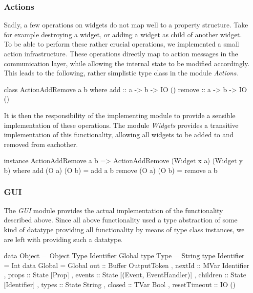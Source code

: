 \documentclass[11pt,a4paper]{article}
\begin{document}
\subsubsection{Actions}
Sadly, a few operations on widgets do not map well to a property structure.
Take for example destroying a widget, or adding a widget as child of another widget.
To be able to perform these rather crucial operations, we implemented a small action infrastructure.
These operations directly map to action messages in the communication layer, while allowing the internal state to be modified accordingly.
This leads to the following, rather simplistic type class in the module \textit{Actions}.

\begin{haskell}
class ActionAddRemove a b where
    add :: a -> b -> IO ()
    remove :: a -> b -> IO ()
\end{haskell}

It is then the responsibility of the implementing module to provide a sensible implementation of these operations.
The module \textit{Widgets} provides a transitive implementation of this functionality, allowing all widgets to be added to and removed from eachother.

\begin{haskell}
instance ActionAddRemove a b =>
  ActionAddRemove (Widget x a) (Widget y b) where
    add (O a) (O b) = add a b
    remove (O a) (O b) = remove a b
\end{haskell}

\subsubsection{GUI}
The \textit{GUI} module provides the actual implementation of the functionality described above.
Since all above functionality used a type abstraction of some kind of datatype providing all functionality by means of type class instances, we are left with providing such a datatype.

\begin{haskell}
data Object = Object Type Identifier Global
type Type = String
type Identifier = Int
data Global = Global { out :: Buffer OutputToken
                     , nextId :: MVar Identifier
                     , props :: State [Prop]
                     , events :: State [(Event, EventHandler)]
                     , children :: State [Identifier]
                     , types :: State String
                     , closed :: TVar Bool
                     , resetTimeout :: IO ()
                     }
\end{haskell}
\end{document}
